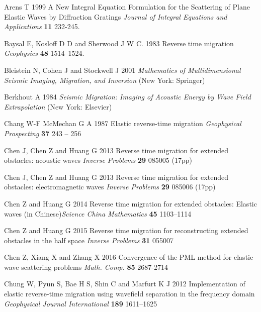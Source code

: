 \documentclass[12pt]{iopart}
\begin{document}
{\begin{thebibliography}{99}
	Arens T 1999 {A New Integral Equation Formulation for the Scattering of Plane Elastic Waves by Diffraction Gratings} {\it Journal of Integral Equations and Applications} {\bf 11} 232-245.
	
	Baysal E, Kosloff D D and Sherwood J W C. 1983 {Reverse time migration} {\it Geophysics} {\bf 48} 1514--1524.
	
	Bleistein N, Cohen J and Stockwell J 2001 {\em Mathematics of Multidimensional Seismic Imaging, Migration, and Inversion} (New York: Springer)
	
	{Berkhout A}  1984 {\em Seismic Migration: Imaging of Acoustic Energy by Wave Field Extrapolation}  (New York: Elsevier)
	
	Chang W-F McMechan G A 1987 {Elastic reverse-time migration} {\it Geophysical Prospecting} {\bf 37} 
	243 -- 256 
	
	Chen J,  Chen Z and  Huang G 2013 {Reverse time migration for extended obstacles: acoustic waves}  {\it Inverse Problems} {\bf 29}  085005 (17pp)
	
	Chen J,  Chen Z and  Huang G 2013 {Reverse time migration for extended obstacles: electromagnetic waves} {\it Inverse Problems}
	{\bf 29} 085006 (17pp)
	
	Chen Z  and  Huang G 2014 {Reverse time migration for extended obstacles: Elastic waves} (in Chinese){\it Science China Mathematics} {\bf 45} 1103--1114
	
	
	Chen Z and Huang G 2015 {Reverse time migration for reconstructing extended obstacles in the half space}  {\it Inverse Problems} {\bf 31 }  055007 
	
	Chen Z, Xiang X and Zhang X 2016 {Convergence of the PML method for elastic wave scattering problems}  {\it Math. Comp.} {\bf 85}  2687-2714
	
	Chung W, Pyun S, Bae H S, Shin C and Marfurt K J 2012 {Implementation of elastic reverse-time migration using wavefield separation in the frequency domain} {\it Geophysical Journal International} {\bf 189} 1611--1625
	

\end{thebibliography}}
\end{document}
